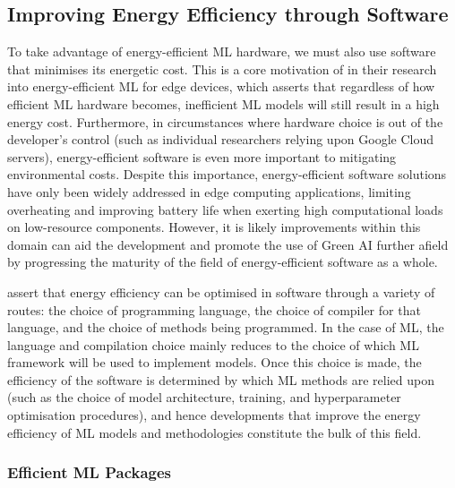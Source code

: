 \documentclass[a4paper, 12pt]{article}
\begin{document}
    \subsection{Improving Energy Efficiency through Software}

    To take advantage of energy-efficient ML hardware, we must also use software that minimises its energetic cost. This is a core motivation of  in their research into energy-efficient ML for edge devices, which asserts that regardless of how efficient ML hardware becomes, inefficient ML models will still result in a high energy cost. Furthermore, in circumstances where hardware choice is out of the developer's control (such as individual researchers relying upon Google Cloud servers), energy-efficient software is even more important to mitigating environmental costs. Despite this importance, energy-efficient software solutions have only been widely addressed in edge computing applications, limiting overheating and improving battery life when exerting high computational loads on low-resource components. However, it is likely improvements within this domain can aid the development and promote the use of Green AI further afield by progressing the maturity of the field of energy-efficient software as a whole.

     assert that energy efficiency can be optimised in software through a variety of routes: the choice of programming language, the choice of compiler for that language, and the choice of methods being programmed. In the case of ML, the language and compilation choice mainly reduces to the choice of which ML framework will be used to implement models. Once this choice is made, the efficiency of the software is determined by which ML methods are relied upon (such as the choice of model architecture, training, and hyperparameter optimisation procedures), and hence developments that improve the energy efficiency of ML models and methodologies constitute the bulk of this field.

    \subsubsection{Efficient ML Packages}
\end{document}

